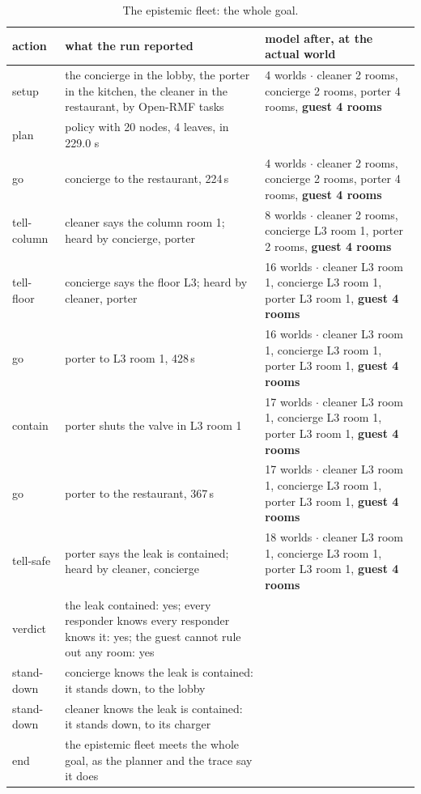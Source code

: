 \documentclass[11pt,a4paper]{article}
\theoremstyle{definition}
\begin{document}
\begin{table}[H]
\centering\scriptsize
\begin{tabularx}{\textwidth}{@{}l X X@{}}
\toprule
action & what the run reported & model after, at the actual world \\
\midrule
setup & the concierge in the lobby, the porter in the kitchen, the cleaner in the restaurant, by Open-RMF tasks & 4 worlds $\cdot$ cleaner 2 rooms, concierge 2 rooms, porter 4 rooms, \textbf{guest 4 rooms} \\
plan & policy with 20 nodes, 4 leaves, in 229.0 s &  \\
go & concierge to the restaurant, 224\,s & 4 worlds $\cdot$ cleaner 2 rooms, concierge 2 rooms, porter 4 rooms, \textbf{guest 4 rooms} \\
tell-column & cleaner says the column room 1; heard by concierge, porter & 8 worlds $\cdot$ cleaner 2 rooms, concierge L3 room 1, porter 2 rooms, \textbf{guest 4 rooms} \\
tell-floor & concierge says the floor L3; heard by cleaner, porter & 16 worlds $\cdot$ cleaner L3 room 1, concierge L3 room 1, porter L3 room 1, \textbf{guest 4 rooms} \\
go & porter to L3 room 1, 428\,s & 16 worlds $\cdot$ cleaner L3 room 1, concierge L3 room 1, porter L3 room 1, \textbf{guest 4 rooms} \\
contain & porter shuts the valve in L3 room 1 & 17 worlds $\cdot$ cleaner L3 room 1, concierge L3 room 1, porter L3 room 1, \textbf{guest 4 rooms} \\
go & porter to the restaurant, 367\,s & 17 worlds $\cdot$ cleaner L3 room 1, concierge L3 room 1, porter L3 room 1, \textbf{guest 4 rooms} \\
tell-safe & porter says the leak is contained; heard by cleaner, concierge & 18 worlds $\cdot$ cleaner L3 room 1, concierge L3 room 1, porter L3 room 1, \textbf{guest 4 rooms} \\
verdict & the leak contained: yes; every responder knows every responder knows it: yes; the guest cannot rule out any room: yes &  \\
stand-down & concierge knows the leak is contained: it stands down, to the lobby &  \\
stand-down & cleaner knows the leak is contained: it stands down, to its charger &  \\
end & the epistemic fleet meets the whole goal, as the planner and the trace say it does &  \\
\bottomrule
\end{tabularx}
\caption{The epistemic fleet: the whole goal.}
\label{tab:run-epistemic}
\end{table}
\end{document}
